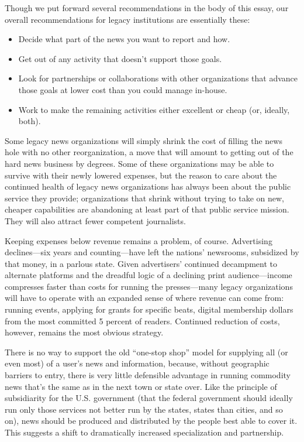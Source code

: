 Though we put forward several recommendations in the body of this essay, our
overall recommendations for legacy institutions are essentially these:

\begin{itemize}
\item Decide what part of the news you want to report and how. 
\item Get out of any activity that doesn’t support those goals. 
\item Look for partnerships or collaborations with other organizations that advance those goals at
lower cost than you could manage in-house. 
\item Work to make the remaining activities either excellent or cheap (or, ideally, both).
\end{itemize}

Some legacy news organizations will simply shrink the cost of filling the news
hole with no other reorganization, a move that will amount to getting out of the
hard news business by degrees. Some of these organizations may be able to survive
with their newly lowered expenses, but the reason to care about the continued
health of legacy news organizations has always been about the public service
they provide; organizations that shrink without trying to take on new, cheaper
capabilities are abandoning at least part of that public service mission. They will
also attract fewer competent journalists.

Keeping expenses below revenue remains a problem, of course. Advertising
declines—six years and counting—have left the nations’ newsrooms, subsidized
by that money, in a parlous state. Given advertisers’ continued decampment to
alternate platforms and the dreadful logic of a declining print audience—income
compresses faster than costs for running the presses—many legacy organizations
will have to operate with an expanded sense of where revenue can come from:
running events, applying for grants for specific beats, digital membership dollars
from the most committed 5 percent of readers. Continued reduction of costs,
however, remains the most obvious strategy.

There is no way to support the old ``one-stop shop'' model for supplying all (or
even most) of a user’s news and information, because, without geographic barriers
to entry, there is very little defensible advantage in running commodity news
that’s the same as in the next town or state over. Like the principle of subsidiarity
for the U.S. government (that the federal government should ideally run only
those services not better run by the states, states than cities, and so on), news
should be produced and distributed by the people best able to cover it. This suggests
a shift to dramatically increased specialization and partnership.

